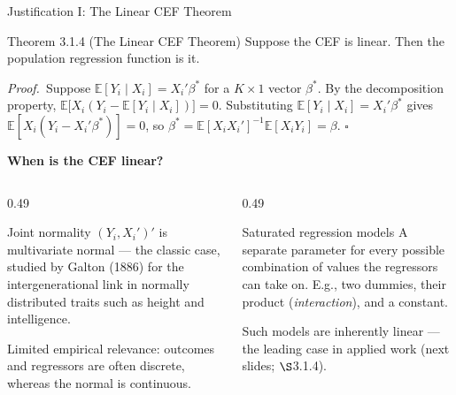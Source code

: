 \documentclass[aspectratio=169,11pt]{beamer}
\newcommand{\E}{\mathbb{E}}
\newcommand{\PrfLbl}{\textcolor{DeepBlue}{\textit{Proof.}}\ }
\newcommand{\QED}{\hfill$\square$}
\newcommand{\Sec}{\ensuremath{\S}}
\begin{document}
\begin{frame}{Justification I: The Linear CEF Theorem}
\small

\begin{block}{Theorem 3.1.4 (The Linear CEF Theorem)}
Suppose the CEF is linear. Then the population regression function is it.
\end{block}

\PrfLbl Suppose $\E[Y_i\mid X_i]=X_i'\beta^*$ for a $K\times1$ vector
$\beta^*$. By the decomposition property,
$\E\big[X_i(Y_i-\E[Y_i\mid X_i])\big]=0$. Substituting
$\E[Y_i\mid X_i]=X_i'\beta^*$ gives $\E[X_i(Y_i-X_i'\beta^*)]=0$, so
$\beta^*=\E[X_iX_i']^{-1}\E[X_iY_i]=\beta$. \QED

\medskip

\textbf{When is the CEF linear?}

\begin{columns}[T]
\begin{column}{0.49\textwidth}
\begin{block}{Joint normality}
$(Y_i,X_i')'$ is multivariate normal --- the classic case, studied by
Galton (1886) for the intergenerational link in normally distributed traits
such as height and intelligence.

\smallskip
\alert{Limited empirical relevance}: outcomes and regressors are often
discrete, whereas the normal is continuous.
\end{block}
\end{column}
\begin{column}{0.49\textwidth}
\begin{block}{Saturated regression models}
A separate parameter for every possible combination of values the
regressors can take on. E.g., two dummies, their product (\emph{interaction}),
and a constant.

\smallskip
Such models are \alert{inherently linear} --- the leading case in applied
work (next slides; \Sec{}3.1.4).
\end{block}
\end{column}
\end{columns}

\end{frame}
\end{document}

